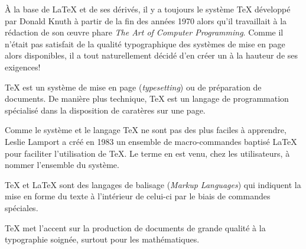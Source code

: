 À la base de {\LaTeX} et de ses dérivés, il y a toujours le système
{\TeX} développé par Donald Knuth à partir de la fin des années 1970
alors qu'il travaillait à la rédaction de son {\oe}uvre phare
\emph{The Art of Computer Programming}. Comme il n'était pas satisfait
de la qualité typographique des systèmes de mise en page alors
disponibles, il a tout naturellement décidé d'en créer un à la hauteur
de ses exigences!

{\TeX} est un système de mise en page (\emph{typesetting}) ou de
préparation de documents. De manière plus technique, {\TeX} est un
langage de programmation spécialisé dans la disposition de caratères
sur une page.

Comme le système et le langage {\TeX} ne sont pas des plus faciles à
apprendre, Leslie Lamport a créé en 1983 un ensemble de
macro-commandes baptisé {\LaTeX} pour faciliter l'utilisation de
{\TeX}. Le terme en est venu, chez les utilisateurs, à nommer
l'ensemble du système.

{\TeX} et {\LaTeX} sont des langages de balisage (\emph{Markup
  Languages}) qui indiquent la mise en forme du texte à l'intérieur de
celui-ci par le biais de commandes spéciales.

{\TeX} met l'accent sur la production de documents de grande qualité à
la typographie soignée, surtout pour les mathématiques.

